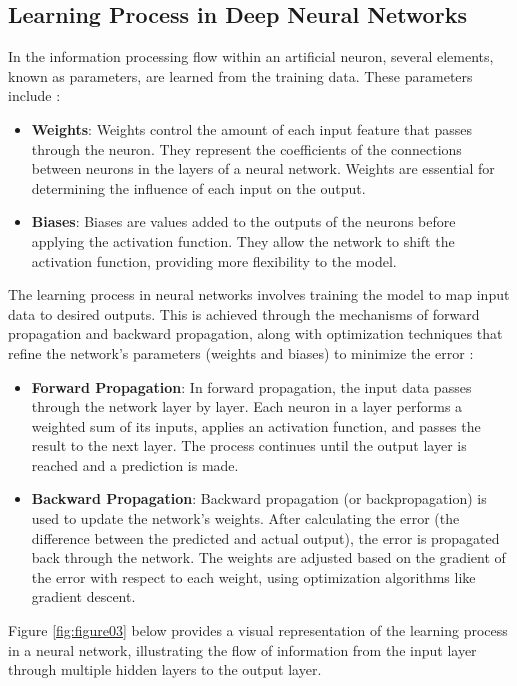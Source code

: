     
\subsection{Learning Process in Deep Neural Networks}

In the information processing flow within an artificial neuron, several elements, known as parameters, are learned from the training data. These parameters include \parencite{Kelleher2019}:
\begin{itemize}
    \item \textbf{Weights}: Weights control the amount of each input feature that passes through the neuron. They represent the coefficients of the connections between neurons in the layers of a neural network. Weights are essential for determining the influence of each input on the output.
    
    \item \textbf{Biases}: Biases are values added to the outputs of the neurons before applying the activation function. They allow the network to shift the activation function, providing more flexibility to the model.
\end{itemize}

The learning process in neural networks involves training the model to map input data to desired outputs. This is achieved through the mechanisms of forward propagation and backward propagation, along with optimization techniques that refine the network's parameters (weights and biases) to minimize the error \parencite{Kelleher2019}:
\begin{itemize}
    \item \textbf{Forward Propagation}: In forward propagation, the input data passes through the network layer by layer. Each neuron in a layer performs a weighted sum of its inputs, applies an activation function, and passes the result to the next layer. The process continues until the output layer is reached and a prediction is made.
    
    \item \textbf{Backward Propagation}: Backward propagation (or backpropagation) is used to update the network's weights. After calculating the error (the difference between the predicted and actual output), the error is propagated back through the network. The weights are adjusted based on the gradient of the error with respect to each weight, using optimization algorithms like gradient descent.
\end{itemize}

Figure \ref{fig:figure03} below provides a visual representation of the learning process in a neural network, illustrating the flow of information from the input layer through multiple hidden layers to the output layer.


